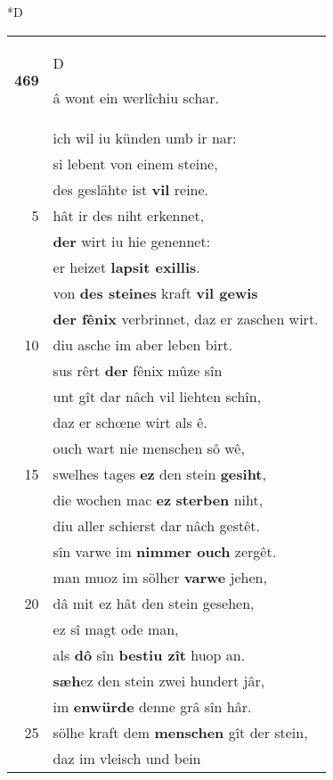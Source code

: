 \documentclass[8pt,a4paper,notitlepage]{article}
\begin{document}
\begin{table}[ht]
\begin{minipage}[t]{0.5\linewidth}
\small
\begin{center}*D
\end{center}
\begin{tabular}{rl}
\textbf{469} & \begin{large}D\end{large}â wont ein werlîchiu schar.\\ 
 & ich wil iu künden umb ir nar:\\ 
 & si lebent von einem steine,\\ 
 & des geslähte ist \textbf{vil} reine.\\ 
5 & hât ir des niht erkennet,\\ 
 & \textbf{der} wirt iu hie genennet:\\ 
 & er heizet \textbf{lapsit exillis}.\\ 
 & von \textbf{des steines} kraft \textbf{vil gewis}\\ 
 & \textbf{der fênix} verbrinnet, daz er zaschen wirt.\\ 
10 & diu asche im aber leben birt.\\ 
 & sus rêrt \textbf{der} fênix mûze sîn\\ 
 & unt gît dar nâch vil liehten schîn,\\ 
 & daz er schœne wirt als ê.\\ 
 & ouch wart nie menschen sô wê,\\ 
15 & swelhes tages \textbf{ez} den stein \textbf{gesiht},\\ 
 & die wochen mac \textbf{ez} \textbf{sterben} niht,\\ 
 & diu aller schierst dar nâch gestêt.\\ 
 & sîn varwe im \textbf{nimmer ouch} zergêt.\\ 
 & man muoz im sölher \textbf{varwe} jehen,\\ 
20 & dâ mit ez hât den stein gesehen,\\ 
 & ez sî magt ode man,\\ 
 & als \textbf{dô} sîn \textbf{bestiu zît} huop an.\\ 
 & \textbf{sæh}ez den stein zwei hundert jâr,\\ 
 & im \textbf{en}\textbf{würde} denne grâ sîn hâr.\\ 
25 & sölhe kraft dem \textbf{menschen} gît der stein,\\ 
 & daz im vleisch und bein\\ 

\end{tabular}
\end{minipage}
\end{table}
\end{document}
